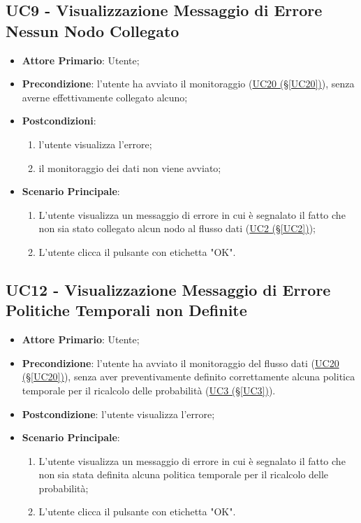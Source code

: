 \pagebreak

\subsection{UC9 - Visualizzazione Messaggio di Errore Nessun Nodo Collegato}\label{UC9}
\begin{itemize}
\item \textbf{Attore Primario}: Utente;
\item \textbf{Precondizione}: l'utente ha avviato il monitoraggio (\hyperref[UC20]{UC20 (§\ref*{UC20})}), senza averne effettivamente collegato alcuno;
\item \textbf{Postcondizioni}:
	\begin{enumerate}
	\item l'utente visualizza l'errore;
	\item il monitoraggio dei dati non viene avviato;
	\end{enumerate}
\item \textbf{Scenario Principale}:
	\begin{enumerate}
	\item L'utente visualizza un messaggio di errore in cui è segnalato il fatto che non sia stato collegato alcun 				nodo al flusso dati (\hyperref[UC2]{UC2 (§\ref*{UC2})});
	\item L'utente clicca il pulsante con etichetta "OK".
	\end{enumerate}
\end{itemize}

\pagebreak

\subsection{UC12 - Visualizzazione Messaggio di Errore Politiche Temporali non Definite}\label{UC12}
\begin{itemize}
\item \textbf{Attore Primario}: Utente;
\item \textbf{Precondizione}: l'utente ha avviato il monitoraggio del flusso dati (\hyperref[UC20]{UC20 							(§\ref*{UC20})}), senza aver preventivamente definito correttamente alcuna politica temporale per il ricalcolo delle probabilità (\hyperref[UC3]{UC3 (§\ref*{UC3})}).
\item \textbf{Postcondizione}: l'utente visualizza l'errore;
\item \textbf{Scenario Principale}:
	\begin{enumerate}
	\item L'utente visualizza un messaggio di errore in cui è segnalato il fatto che non sia stata definita alcuna 				politica temporale per il ricalcolo delle probabilità;
	\item L'utente clicca il pulsante con etichetta "OK".
	\end{enumerate}
\end{itemize}

